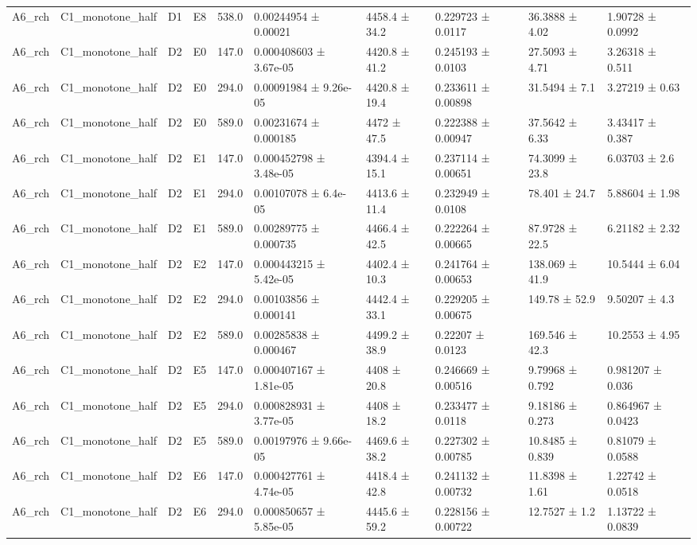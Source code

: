 \begin{table}
\begin{tabular}{llllllllll}
A6\_rch & C1\_monotone\_half & D1 & E8 & 538.0 & 0.00244954 ± 0.00021 & 4458.4 ± 34.2 & 0.229723 ± 0.0117 & 36.3888 ± 4.02 & 1.90728 ± 0.0992 \\
A6\_rch & C1\_monotone\_half & D2 & E0 & 147.0 & 0.000408603 ± 3.67e-05 & 4420.8 ± 41.2 & 0.245193 ± 0.0103 & 27.5093 ± 4.71 & 3.26318 ± 0.511 \\
A6\_rch & C1\_monotone\_half & D2 & E0 & 294.0 & 0.00091984 ± 9.26e-05 & 4420.8 ± 19.4 & 0.233611 ± 0.00898 & 31.5494 ± 7.1 & 3.27219 ± 0.63 \\
A6\_rch & C1\_monotone\_half & D2 & E0 & 589.0 & 0.00231674 ± 0.000185 & 4472 ± 47.5 & 0.222388 ± 0.00947 & 37.5642 ± 6.33 & 3.43417 ± 0.387 \\
A6\_rch & C1\_monotone\_half & D2 & E1 & 147.0 & 0.000452798 ± 3.48e-05 & 4394.4 ± 15.1 & 0.237114 ± 0.00651 & 74.3099 ± 23.8 & 6.03703 ± 2.6 \\
A6\_rch & C1\_monotone\_half & D2 & E1 & 294.0 & 0.00107078 ± 6.4e-05 & 4413.6 ± 11.4 & 0.232949 ± 0.0108 & 78.401 ± 24.7 & 5.88604 ± 1.98 \\
A6\_rch & C1\_monotone\_half & D2 & E1 & 589.0 & 0.00289775 ± 0.000735 & 4466.4 ± 42.5 & 0.222264 ± 0.00665 & 87.9728 ± 22.5 & 6.21182 ± 2.32 \\
A6\_rch & C1\_monotone\_half & D2 & E2 & 147.0 & 0.000443215 ± 5.42e-05 & 4402.4 ± 10.3 & 0.241764 ± 0.00653 & 138.069 ± 41.9 & 10.5444 ± 6.04 \\
A6\_rch & C1\_monotone\_half & D2 & E2 & 294.0 & 0.00103856 ± 0.000141 & 4442.4 ± 33.1 & 0.229205 ± 0.00675 & 149.78 ± 52.9 & 9.50207 ± 4.3 \\
A6\_rch & C1\_monotone\_half & D2 & E2 & 589.0 & 0.00285838 ± 0.000467 & 4499.2 ± 38.9 & 0.22207 ± 0.0123 & 169.546 ± 42.3 & 10.2553 ± 4.95 \\
A6\_rch & C1\_monotone\_half & D2 & E5 & 147.0 & 0.000407167 ± 1.81e-05 & 4408 ± 20.8 & 0.246669 ± 0.00516 & 9.79968 ± 0.792 & 0.981207 ± 0.036 \\
A6\_rch & C1\_monotone\_half & D2 & E5 & 294.0 & 0.000828931 ± 3.77e-05 & 4408 ± 18.2 & 0.233477 ± 0.0118 & 9.18186 ± 0.273 & 0.864967 ± 0.0423 \\
A6\_rch & C1\_monotone\_half & D2 & E5 & 589.0 & 0.00197976 ± 9.66e-05 & 4469.6 ± 38.2 & 0.227302 ± 0.00785 & 10.8485 ± 0.839 & 0.81079 ± 0.0588 \\
A6\_rch & C1\_monotone\_half & D2 & E6 & 147.0 & 0.000427761 ± 4.74e-05 & 4418.4 ± 42.8 & 0.241132 ± 0.00732 & 11.8398 ± 1.61 & 1.22742 ± 0.0518 \\
A6\_rch & C1\_monotone\_half & D2 & E6 & 294.0 & 0.000850657 ± 5.85e-05 & 4445.6 ± 59.2 & 0.228156 ± 0.00722 & 12.7527 ± 1.2 & 1.13722 ± 0.0839 \\

\end{tabular}
\end{table}
